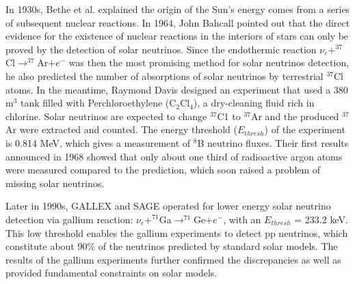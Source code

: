 \documentclass[preprint,12pt]{elsarticle}
\begin{document}
In 1930s, Bethe et al. explained the origin of the Sun's energy comes from a series of subsequent nuclear reactions\cite{bethe2}. In 1964, John Bahcall pointed out that the direct evidence for the existence of nuclear reactions in the interiors of stars can only be proved by the detection of solar neutrinos. Since the endothermic reaction $\nu_e+^{37}$Cl$\to^{37}$Ar$+e^-$ was then the most promising method for solar neutrinos detection, he also predicted the number of absorptions of solar neutrinos by terrestrial $^{37}$Cl atoms\cite{bahcall1}. In the meantime, Raymond Davis designed an experiment that used a 380 m$^3$ tank filled with Perchloroethylene (C$_2$Cl$_4$), a dry-cleaning fluid rich in chlorine. Solar neutrinos are expected to change $^{37}$C1 to $^{37}$Ar and the produced $^{37}$Ar were extracted and counted. The energy threshold ($E_{thresh}$) of the experiment is 0.814 MeV, which gives a measurement of $^8$B neutrino fluxes\cite{raymond}. Their first results announced in 1968 showed that only about one third of radioactive argon atoms were measured compared to the prediction, which soon raised a problem of missing solar neutrinos. 

Later in 1990s, GALLEX and SAGE operated for lower energy solar neutrino detection via gallium reaction: $\nu_e+^{71}$Ga$\to^{71}$Ge$+e^-$, with an $E_{thresh}$ = 233.2 keV. This low threshold enables the gallium experiments to detect pp neutrinos, which constitute about 90\% of the neutrinos predicted by standard solar models. The results of the gallium experiments further confirmed the discrepancies as well as provided fundamental constraints on solar models\cite{GALLEX,SAGE,bahcall2}.
\end{document}
